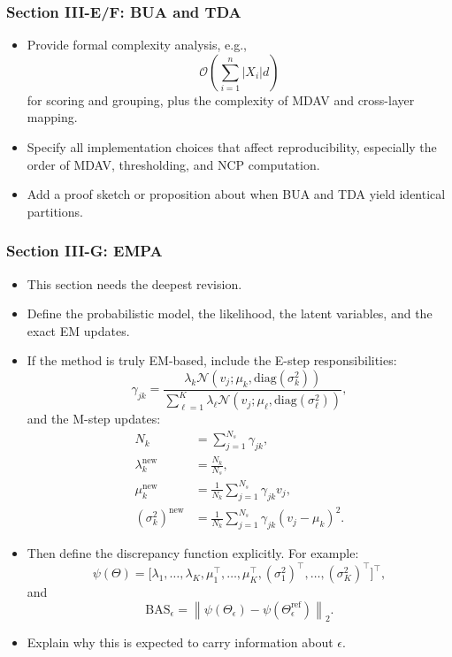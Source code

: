 \subsubsection*{Section III-E/F: BUA and TDA}
\begin{itemize}
    \item Provide formal complexity analysis, e.g.,
    \begin{equation}
    \mathcal{O}\!\left(\sum_{i=1}^{n} |X_i| d\right)
    \end{equation}
    for scoring and grouping, plus the complexity of MDAV and cross-layer mapping.
    \item Specify all implementation choices that affect reproducibility, especially the order of MDAV, thresholding, and NCP computation.
    \item Add a proof sketch or proposition about when BUA and TDA yield identical partitions.
\end{itemize}

\subsubsection*{Section III-G: EMPA}
\begin{itemize}
    \item This section needs the deepest revision.
    \item Define the probabilistic model, the likelihood, the latent variables, and the exact EM updates.
    \item If the method is truly EM-based, include the E-step responsibilities:
    \begin{equation}
    \gamma_{jk} = \frac{\lambda_k \mathcal{N}(v_j; \mu_k, \mathrm{diag}(\sigma_k^2))}{\sum_{\ell=1}^{K} \lambda_{\ell} \mathcal{N}(v_j; \mu_{\ell}, \mathrm{diag}(\sigma_{\ell}^2))},
    \end{equation}
    and the M-step updates:
    \begin{align}
    N_k &= \sum_{j=1}^{N_s} \gamma_{jk}, \\
    \lambda_k^{\text{new}} &= \frac{N_k}{N_s}, \\
    \mu_k^{\text{new}} &= \frac{1}{N_k} \sum_{j=1}^{N_s} \gamma_{jk} v_j, \\
    (\sigma_k^2)^{\text{new}} &= \frac{1}{N_k} \sum_{j=1}^{N_s} \gamma_{jk}(v_j-\mu_k)^2.
    \end{align}
    \item Then define the discrepancy function explicitly. For example:
    \begin{equation}
    \psi(\Theta) = \big[\lambda_1,\ldots,\lambda_K,\mu_1^\top,\ldots,\mu_K^\top, (\sigma_1^2)^\top,\ldots,(\sigma_K^2)^\top\big]^\top,
    \end{equation}
    and
    \begin{equation}
    \mathrm{BAS}_{\epsilon} = \left\| \psi(\Theta_{\epsilon}) - \psi(\Theta_{\epsilon}^{\mathrm{ref}}) \right\|_2.
    \end{equation}
    \item Explain why this is expected to carry information about $\epsilon$.
\end{itemize}

